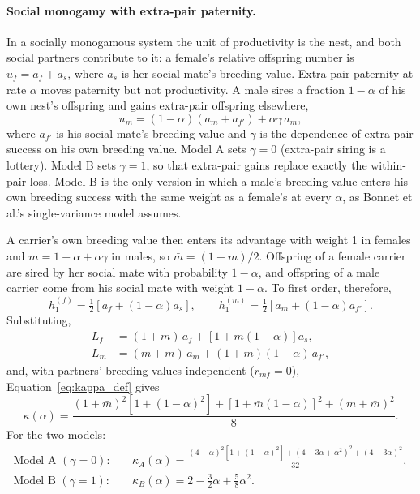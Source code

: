 \documentclass[12pt]{article}
\begin{document}
\paragraph{Social monogamy with extra-pair paternity.} In a socially monogamous system the unit of productivity is the nest, and both social partners contribute to it: a female's relative offspring number is $u_f = a_f + a_s$, where $a_s$ is her social mate's breeding value. Extra-pair paternity at rate $\alpha$ moves paternity but not productivity. A male sires a fraction $1-\alpha$ of his own nest's offspring and gains extra-pair offspring elsewhere,
\begin{equation}
    u_m = (1-\alpha)(a_m + a_{f'}) + \alpha\gamma\, a_m,
\end{equation}
where $a_{f'}$ is his social mate's breeding value and $\gamma$ is the dependence of extra-pair success on his own breeding value. Model A sets $\gamma = 0$ (extra-pair siring is a lottery). Model B sets $\gamma = 1$, so that extra-pair gains replace exactly the within-pair loss. Model B is the only version in which a male's breeding value enters his own breeding success with the same weight as a female's at every $\alpha$, as Bonnet et al.'s single-variance model assumes.

A carrier's own breeding value then enters its advantage with weight 1 in females and $m = 1 - \alpha + \alpha\gamma$ in males, so $\bar{m} = (1+m)/2$. Offspring of a female carrier are sired by her social mate with probability $1-\alpha$, and offspring of a male carrier come from his social mate with weight $1-\alpha$. To first order, therefore,
\begin{equation}
    h_1^{(f)} = \tfrac{1}{2}\left[a_f + (1-\alpha)a_s\right], \qquad h_1^{(m)} = \tfrac{1}{2}\left[a_m + (1-\alpha)a_{f'}\right].
\end{equation}
Substituting,
\begin{align}
    L_f &= (1+\bar{m})\,a_f + \left[1 + \bar{m}(1-\alpha)\right] a_s, \\
    L_m &= (m+\bar{m})\,a_m + (1+\bar{m})(1-\alpha)\,a_{f'},
\end{align}
and, with partners' breeding values independent ($r_{mf} = 0$), Equation~\eqref{eq:kappa_def} gives
\begin{equation}
    \kappa(\alpha) = \frac{(1+\bar{m})^2\left[1+(1-\alpha)^2\right] + \left[1+\bar{m}(1-\alpha)\right]^2 + (m+\bar{m})^2}{8}.
\end{equation}
For the two models:
\begin{align}
    \text{Model A } (\gamma = 0):&\quad \kappa_A(\alpha) = \frac{(4-\alpha)^2\left[1+(1-\alpha)^2\right] + (4-3\alpha+\alpha^2)^2 + (4-3\alpha)^2}{32}, \\
    \text{Model B } (\gamma = 1):&\quad \kappa_B(\alpha) = 2 - \tfrac{3}{2}\alpha + \tfrac{5}{8}\alpha^2.
\end{align}
\end{document}
